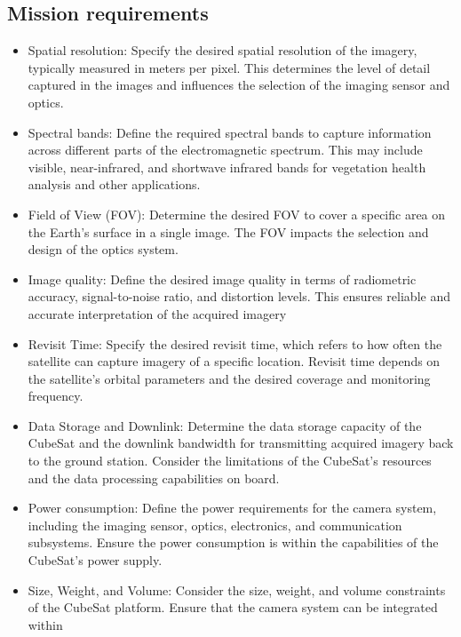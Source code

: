 \subsection{Mission requirements}
\begin{itemize}
	\item Spatial resolution: Specify the desired spatial resolution of the imagery, typically measured in meters per pixel. This determines the level of detail captured in the images and influences the selection of the imaging sensor and optics.
	\item Spectral bands: Define the required spectral bands to capture information across 	different parts of the electromagnetic spectrum. This may include visible, near-infrared, and shortwave infrared bands for vegetation health analysis and other
	applications.
	\item Field of View (FOV): Determine the desired FOV to cover a specific area on the Earth’s surface in a single image. The FOV impacts the selection and design of the optics system.
	\item Image quality: Define the desired image quality in terms of radiometric accuracy, signal-to-noise ratio, and distortion levels. This ensures reliable and accurate interpretation of the acquired imagery
	\item  Revisit Time: Specify the desired revisit time, which refers to how often the satellite can capture imagery of a specific location. Revisit time depends on the satellite’s orbital parameters and the desired coverage and monitoring frequency.
	\item Data Storage and Downlink: Determine the data storage capacity of the CubeSat and the downlink bandwidth for transmitting acquired imagery back to the ground station. Consider the limitations of the CubeSat’s resources and the data processing capabilities on board.
	\item Power consumption: Define the power requirements for the camera system, including the imaging sensor, optics, electronics, and communication subsystems. Ensure the power consumption is within the capabilities of the CubeSat’s power supply.
	\item Size, Weight, and Volume: Consider the size, weight, and volume constraints of the CubeSat platform. Ensure that the camera system can be integrated within
\end{itemize}